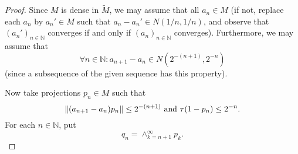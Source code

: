 \begin{proof}
Since $M$ is dense in $\widetilde{M}$, we may assume that all $a_n\in M$ (if not, replace each $a_n$ by $a_n'\in M$ such that $a_n-a_n'\in N(1/n, 1/n)$, and observe that $(a_n')_{n\in \mathbb{N}}$ converges if and only if $(a_n)_{n\in \mathbb{N}}$ converges). Furthermore, we may assume that 
\[
    \forall n\in \mathbb{N}: a_{n+1}-a_n\in N(2^{-(n+1)},2^{-n})  
\]
(since a subsequence of the given sequence has this property).\par
Now take projections $p_n \in M$ such that 
\[
    \norm{(a_{n+1}-a_n)p_n}\leq 2^{-(n+1)} \text{ and } \tau(1-p_n)\leq 2^{-n}.  
\]
For each $n\in \mathbb{N}$, put
\[
    q_n=\wedge_{k=n+1}^\infty p_k.
\]  
\end{proof}

% 